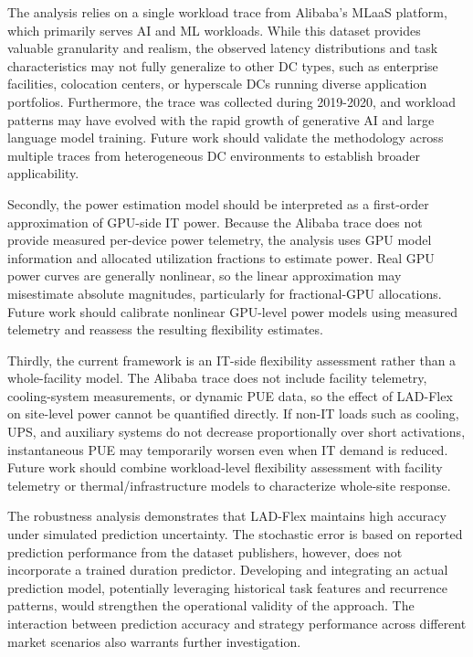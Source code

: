 \documentclass[preprint,12pt]{elsarticle}
\begin{document}
The analysis relies on a single workload trace from Alibaba's MLaaS platform, which primarily serves AI and ML workloads. While this dataset provides valuable granularity and realism, the observed latency distributions and task characteristics may not fully generalize to other DC types, such as enterprise facilities, colocation centers, or hyperscale DCs running diverse application portfolios. Furthermore, the trace was collected during 2019-2020, and workload patterns may have evolved with the rapid growth of generative AI and large language model training. Future work should validate the methodology across multiple traces from heterogeneous DC environments to establish broader applicability.

Secondly, the power estimation model should be interpreted as a first-order approximation of GPU-side IT power. Because the Alibaba trace does not provide measured per-device power telemetry, the analysis uses GPU model information and allocated utilization fractions to estimate power. Real GPU power curves are generally nonlinear, so the linear approximation may misestimate absolute magnitudes, particularly for fractional-GPU allocations. Future work should calibrate nonlinear GPU-level power models using measured telemetry and reassess the resulting flexibility estimates.

Thirdly, the current framework is an IT-side flexibility assessment rather than a whole-facility model. The Alibaba trace does not include facility telemetry, cooling-system measurements, or dynamic PUE data, so the effect of LAD-Flex on site-level power cannot be quantified directly. If non-IT loads such as cooling, UPS, and auxiliary systems do not decrease proportionally over short activations, instantaneous PUE may temporarily worsen even when IT demand is reduced. Future work should combine workload-level flexibility assessment with facility telemetry or thermal/infrastructure models to characterize whole-site response.

The robustness analysis demonstrates that LAD-Flex maintains high accuracy under simulated prediction uncertainty. The stochastic error is based on reported prediction performance from the dataset publishers, however, does not incorporate a trained duration predictor. Developing and integrating an actual prediction model, potentially leveraging historical task features and recurrence patterns, would strengthen the operational validity of the approach. The interaction between prediction accuracy and strategy performance across different market scenarios also warrants further investigation.
\end{document}
